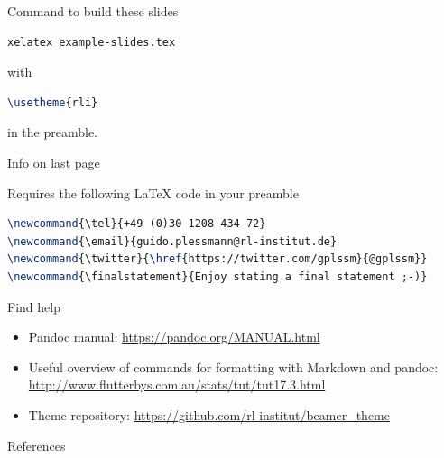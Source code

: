 \documentclass[ignorenonframetext,aspectratio=169]{beamer}
\makeatletter
\newcommand{\tel}{+49 (0)30 1208 434 72}
\newcommand{\email}{guido.plessmann@rl-institut.de}
\newcommand{\twitter}{\href{https://twitter.com/gplssm}{@gplssm}}
\newcommand{\finalstatement}{Enjoy stating a final statement ;-)}
\makeatother
\begin{document}
\begin{frame}[fragile]{Command to build these slides}

\begin{lstlisting}[language=Bash]
xelatex example-slides.tex
\end{lstlisting}

with

\begin{lstlisting}[language=TeX]
\usetheme{rli}
\end{lstlisting}
in the preamble.
\end{frame}

\begin{frame}[fragile]{Info on last page}

Requires the following \LaTeX{} code in your preamble

\begin{lstlisting}[language=TeX]
\newcommand{\tel}{+49 (0)30 1208 434 72}
\newcommand{\email}{guido.plessmann@rl-institut.de}
\newcommand{\twitter}{\href{https://twitter.com/gplssm}{@gplssm}}
\newcommand{\finalstatement}{Enjoy stating a final statement ;-)}
\end{lstlisting}

\end{frame}

\begin{frame}{Find help}

\begin{itemize}
\item Pandoc manual: \url{https://pandoc.org/MANUAL.html}
\item Useful overview of commands for formatting with Markdown and pandoc:
  \url{http://www.flutterbys.com.au/stats/tut/tut17.3.html}
\item Theme repository: \url{https://github.com/rl-institut/beamer_theme}
\end{itemize}

\end{frame}


\begin{frame}[plain]{}

\insertendpagecontent

\end{frame}

\begin{frame}{References}

 
\end{frame}
\end{document}
